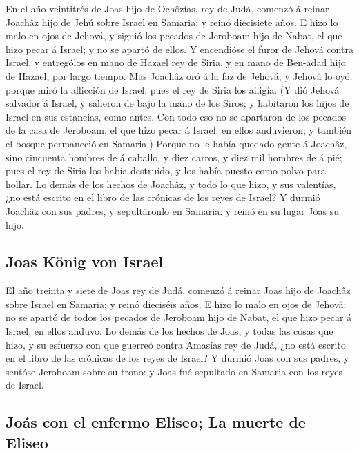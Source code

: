  En el año veintitrés de Joas hijo de Ochôzías, rey de Judá,
comenzó á reinar Joachâz hijo de Jehú sobre Israel en Samaria; y reinó
diecisiete años.  E hizo lo malo en ojos de Jehová, y siguió
los pecados de Jeroboam hijo de Nabat, el que hizo pecar á Israel; y no
se apartó de ellos.  Y encendióse el furor de Jehová contra
Israel, y entrególos en mano de Hazael rey de Siria, y en mano de
Ben-adad hijo de Hazael, por largo tiempo.  Mas Joachâz oró
á la faz de Jehová, y Jehová lo oyó: porque miró la aflicción de Israel,
pues el rey de Siria los afligía.  (Y dió Jehová salvador á
Israel, y salieron de bajo la mano de los Siros; y habitaron los hijos
de Israel en sus estancias, como antes.  Con todo eso no se
apartaron de los pecados de la casa de Jeroboam, el que hizo pecar á
Israel: en ellos anduvieron; y también el bosque permaneció en Samaria.)
 Porque no le había quedado gente á Joachâz, sino cincuenta
hombres de á caballo, y diez carros, y diez mil hombres de á pié; pues
el rey de Siria los había destruído, y los había puesto como polvo para
hollar.  Lo demás de los hechos de Joachâz, y todo lo que
hizo, y sus valentías, ¿no está escrito en el libro de las crónicas de
los reyes de Israel?  Y durmió Joachâz con sus padres, y
sepultáronlo en Samaria: y reinó en su lugar Joas su hijo.

\hypertarget{joas-kuxf6nig-von-israel}{%
\subsection{Joas König von Israel}\label{joas-kuxf6nig-von-israel}}

 El año treinta y siete de Joas rey de Judá, comenzó á
reinar Joas hijo de Joachâz sobre Israel en Samaria; y reinó dieciséis
años.  E hizo lo malo en ojos de Jehová: no se apartó de
todos los pecados de Jeroboam hijo de Nabat, el que hizo pecar á Israel;
en ellos anduvo.  Lo demás de los hechos de Joas, y todas
las cosas que hizo, y su esfuerzo con que guerreó contra Amasías rey de
Judá, ¿no está escrito en el libro de las crónicas de los reyes de
Israel?  Y durmió Joas con sus padres, y sentóse Jeroboam
sobre su trono: y Joas fué sepultado en Samaria con los reyes de Israel.

\hypertarget{jouxe1s-con-el-enfermo-eliseo-la-muerte-de-eliseo}{%
\subsection{Joás con el enfermo Eliseo; La muerte de
Eliseo}\label{jouxe1s-con-el-enfermo-eliseo-la-muerte-de-eliseo}}

